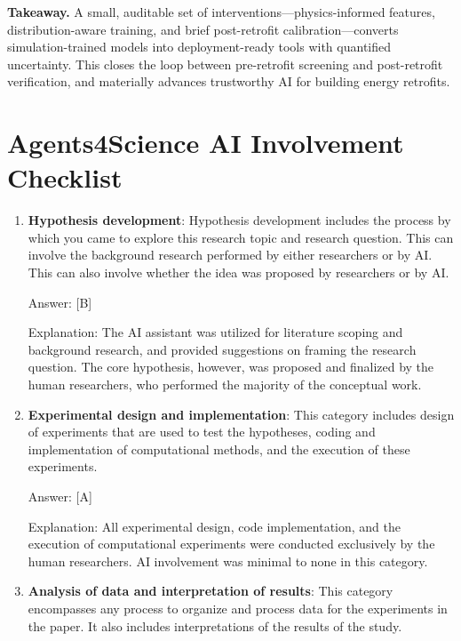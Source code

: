 ﻿\documentclass{article}
\begin{document}
\noindent\textbf{Takeaway.} A small, auditable set of interventions---physics-informed features, distribution-aware training, and brief post-retrofit calibration---converts simulation-trained models into deployment-ready tools with quantified uncertainty. This closes the loop between pre-retrofit screening and post-retrofit verification, and materially advances trustworthy AI for building energy retrofits.




\section*{Agents4Science AI Involvement Checklist}

\begin{enumerate}
    \item \textbf{Hypothesis development}: Hypothesis development includes the process by which you came to explore this research topic and research question. This can involve the background research performed by either researchers or by AI. This can also involve whether the idea was proposed by researchers or by AI.

    Answer: [B]
    
    Explanation: The AI assistant was utilized for literature scoping and background research, and provided suggestions on framing the research question. The core hypothesis, however, was proposed and finalized by the human researchers, who performed the majority of the conceptual work.

    \item \textbf{Experimental design and implementation}: This category includes design of experiments that are used to test the hypotheses, coding and implementation of computational methods, and the execution of these experiments. 

    Answer: [A]
    
    Explanation: All experimental design, code implementation, and the execution of computational experiments were conducted exclusively by the human researchers. AI involvement was minimal to none in this category.

    \item \textbf{Analysis of data and interpretation of results}: This category encompasses any process to organize and process data for the experiments in the paper. It also includes interpretations of the results of the study.


\end{enumerate}
\end{document}
